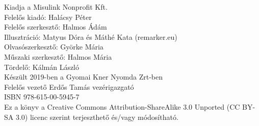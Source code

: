    
\cleardoublepage\null\vfill
\pagestyle{empty}
\begin{minipage}[b]{0.9\textwidth}
\footnotesize\raggedright
\setlength{\parskip}{0.5\baselineskip}
Kiadja a Misulink Nonprofit Kft.\\
Felelős kiadó: Halácsy Péter \\
Felelős szerkesztő: Halmos Ádám \\
Illusztráció: Matyus Dóra és Máthé Kata (remarker.eu) \\
Olvasószerkesztő: Györke Mária \\
Műszaki szerkesztő: Halmos Mária \\
Tördelő: Kálmán László\\
Készült 2019-ben a Gyomai Kner Nyomda Zrt-ben \\
Felelős vezető Erdős Tamás  vezérigazgató \\
ISBN 978-615-00-5945-7\\
\smallskip
Ez a könyv a Creative Commons Attribution-ShareAlike 3.0 Unported (CC BY-SA 3.0) licenc szerint terjeszthető és/vagy módosítható.
\end{minipage}
\vspace*{2\baselineskip}

